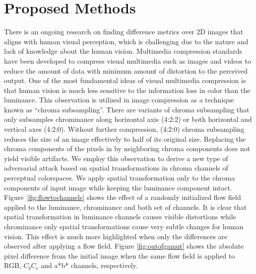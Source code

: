 \section{Proposed Methods}
There is an ongoing research on finding difference metrics over 2D images that aligns with human visual perception, which is challenging due to the nature and lack of knowledge about the human vision. Multimedia compression standards have been developed to compress visual multimedia such as images and videos to reduce the amount of data with minimum amount of distortion to the perceived output. One of the most fundamental ideas of visual multimedia compression is that human vision is much less sensitive to the information loss in color than the luminance.
This observation is utilized in image compression as a technique known as ``chroma subsampling''. There are variants of chroma subsampling that only subsamples chrominance along horizontal axis (4:2:2) or both horizontal and vertical axes (4:2:0). Without further compression, (4:2:0) chroma subsampling reduces the size of an image effectively to half of its original size. Replacing the chroma components of the pixels in by neighboring chroma components does not yield visible artifacts. We employ this observation to derive a new type of adversarial attack based on spatial transformations in chroma channels of perceptual colorspaces. We apply spatial transformation only to the chroma components of input image while keeping the luminance component intact. Figure~\ref{fig:flowtochannels} shows the effect of a randomly initialized flow field applied to the luminance, chrominance and both set of channels. It is clear that spatial transformation in luminance channels causes visible distortions while chrominance only spatial transformations cause very subtle changes for human vision. This effect is much more highlighted when only the differences are observed after applying a flow field. Figure \ref{fig:outofgamut} shows the absolute pixel difference from the initial image when the same flow field is applied to RGB, \(C_{b}C_{r}\) and a*b* channels, respectively.
